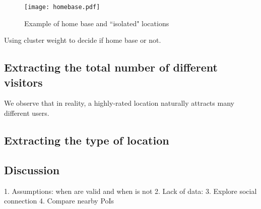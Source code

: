 \begin{figure}[htb]
\center
{\texttt{[image: homebase.pdf]}}
\caption{Example of home base and ``isolated" locations} 
\label{example}
\end{figure}

Using cluster weight to decide if home base or not.

\subsection{Extracting the total number of different visitors}

We observe that in reality, a highly-rated location naturally attracts many different users.


\subsection{Extracting the type of location}


\subsection{Discussion}
1. Assumptions: when are valid and when is not
2. Lack of data: 
3. Explore social connection
4. Compare nearby PoIs
